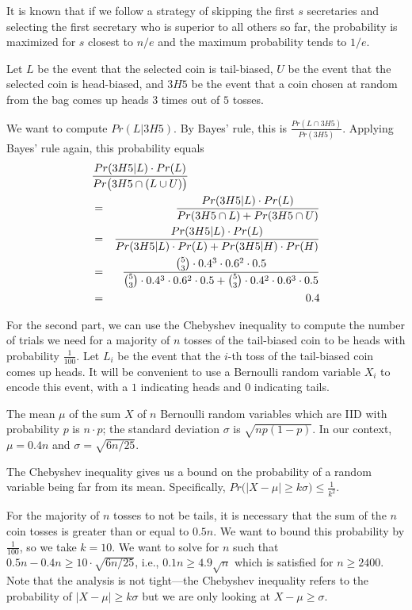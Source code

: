 It is known that if we follow a strategy of skipping the first
$s$ secretaries and selecting the first secretary who is superior to all others so
far, the probability is maximized for $s$ closest to $n/e$ and the maximum probability
tends to  $1/e$.

Let $L$ be the event that the selected coin is tail-biased, $U$ be the
event that the selected coin is head-biased, and $3H5$ be the event
that a coin chosen at random from the bag comes up heads $3$ times out of $5$ tosses.

We want to compute $Pr( L | 3H5)$. By Bayes' rule, this is $\frac{Pr( L \cap 3H5) }{Pr(3H5)}$.
Applying Bayes' rule again, this probability equals
\begin{eqnarray*}
\lefteqn{\frac{Pr(3H5|L)\cdot Pr(L)}{Pr\big(3H5\cap(L \cup U)\big)}} \\
& = & \frac{Pr(3H5|L)\cdot Pr(L)}{Pr(3H5 \cap L) + Pr(3H5 \cap U)} \\
& = &  \frac{Pr(3H5|L)\cdot Pr(L)}{Pr(3H5|L)\cdot Pr(L) + Pr(3H5|H)\cdot Pr(H)} \\
& = & \frac{\binom{5}{3}\cdot0.4^3\cdot 0.6^2\cdot 0.5}{\binom{5}{3}\cdot0.4^3\cdot 0.6^2\cdot 0.5 + \binom{5}{3}\cdot0.4^2\cdot 0.6^3\cdot 0.5} \\
& = & 0.4
\end{eqnarray*}

For the second part, we can use the Chebyshev inequality to compute the number of trials we need for 
a majority of $n$ tosses of the tail-biased coin to be heads with probability $\frac{1}{100}$.
Let $L_i$ be the event that the $i$-th toss of the tail-biased coin comes up heads.
It will be convenient to use a Bernoulli random variable $X_i$ to encode
this event, with a $1$ indicating heads and $0$ indicating tails.

The mean $\mu$ of the sum $X$ of 
$n$ Bernoulli random variables which are IID with probability $p$ is
$n\cdot p$; the standard deviation $\sigma$ is $\sqrt{np(1-p)}$. In our context,
$\mu = 0.4n$ and $\sigma = \sqrt{6n/25}$.

The Chebyshev inequality gives us a bound on the probability of a random variable
being far from its mean. Specifically, $Pr\big( |X - \mu| \geq k \sigma \big) \leq \frac{1}{k^2}$.

For the majority of $n$ tosses to not be tails, it is necessary that 
the sum of the $n$ coin tosses is greater than or equal to $0.5n$.
We want to bound this probability by $\frac{1}{100}$, so we take $k=10$. 
We want to solve for $n$ such that $0.5n -  0.4n \geq 10 \cdot \sqrt{6n/25}$, i.e.,
$0.1n \geq 4.9 \sqrt n$ which is satisfied for $n \geq 2400$.
Note that the analysis is not tight---the Chebyshev inequality refers to the probability of $|X - \mu| \geq k \sigma$ but we are only looking at $X - \mu \geq \sigma$.

